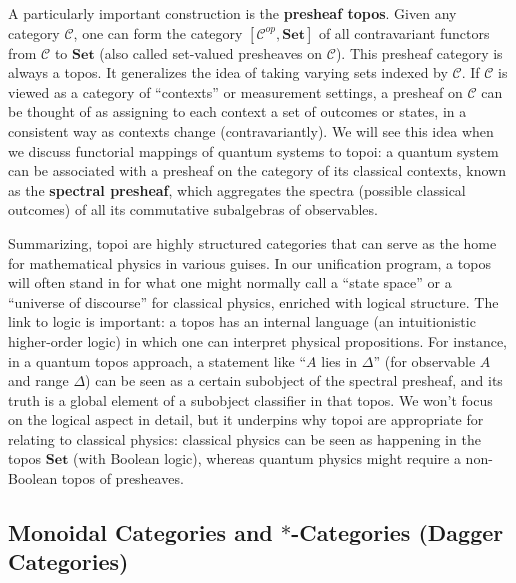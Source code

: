 \vspace{1em}
A particularly important construction is the \textbf{presheaf topos}. Given any category $\mathcal{C}$, one can form the category $[\mathcal{C}^{op}, \mathbf{Set}]$ of all contravariant functors from $\mathcal{C}$ to $\mathbf{Set}$ (also called set-valued presheaves on $\mathcal{C}$). This presheaf category is always a topos. It generalizes the idea of taking varying sets indexed by $\mathcal{C}$. If $\mathcal{C}$ is viewed as a category of ``contexts'' or measurement settings, a presheaf on $\mathcal{C}$ can be thought of as assigning to each context a set of outcomes or states, in a consistent way as contexts change (contravariantly). We will see this idea when we discuss functorial mappings of quantum systems to topoi: a quantum system can be associated with a presheaf on the category of its classical contexts, known as the \textbf{spectral presheaf}, which aggregates the spectra (possible classical outcomes) of all its commutative subalgebras of observables.

\vspace{1em}
Summarizing, topoi are highly structured categories that can serve as the home for mathematical physics in various guises. In our unification program, a topos will often stand in for what one might normally call a ``state space'' or a ``universe of discourse'' for classical physics, enriched with logical structure. The link to logic is important: a topos has an internal language (an intuitionistic higher-order logic) in which one can interpret physical propositions. For instance, in a quantum topos approach, a statement like ``$A$ lies in $\Delta$'' (for observable $A$ and range $\Delta$) can be seen as a certain subobject of the spectral presheaf, and its truth is a global element of a subobject classifier in that topos. We won't focus on the logical aspect in detail, but it underpins why topoi are appropriate for relating to classical physics: classical physics can be seen as happening in the topos $\mathbf{Set}$ (with Boolean logic), whereas quantum physics might require a non-Boolean topos of presheaves.

\vspace{1.5em}
\subsection{Monoidal Categories and $*$-Categories (Dagger Categories)}

